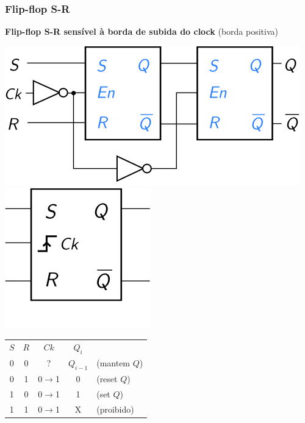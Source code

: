 \documentclass{beamer}
\begin{document}
\begin{frame}
\frametitle{Flip-flop S-R}

\textbf{Flip-flop S-R sensível à borda de subida do clock} (borda positiva)

\begin{center}
\includegraphics{images/flipflopRSpos_circuit}
\hspace{2ex}
\raisebox{50pt}{\Huge$=$}
\hspace{2ex}
\includegraphics{images/flipflopRSpos_blackbox}

\vspace{12pt}

\begin{tabular}{ccc||cl}
$S$ & $R$ &        $Ck$       & $Q_i$ \\
\cline{1-4}
 0  &  0  &        $?$        & $Q_{i-1}$  & (mantem $Q$) \\
 0  &  1  &  0$\rightarrow$1  &     0      & (reset $Q$) \\
 1  &  0  &  0$\rightarrow$1  &     1      & (set $Q$) \\
 1  &  1  &  0$\rightarrow$1  &     X  & (proibido) \\
\end{tabular}
\end{center}

\end{frame}
\end{document}
